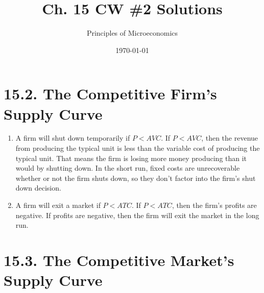 \documentclass{article}
\title{Ch. 15 CW \#2 Solutions}
\author{Principles of Microeconomics}
\date{\today}
\begin{document}
\maketitle

\section*{15.2. The Competitive Firm's Supply Curve}

\begin{enumerate}

\item A firm will shut down temporarily if $P < AVC$. If $P < AVC$, then the revenue from producing the typical unit is less than the  variable cost of producing the typical unit. That means the firm is losing more money producing than it would by shutting down. In the short run, fixed costs are unrecoverable whether or not the firm shuts down, so they don't factor into the firm's shut down decision.

\item A firm will exit a market if $P < ATC$. If $P < ATC$, then the firm's profits are negative. If profits are negative, then the firm will exit the market in the long run.

\end{enumerate}

\section*{15.3. The Competitive Market's Supply Curve}
\end{document}
